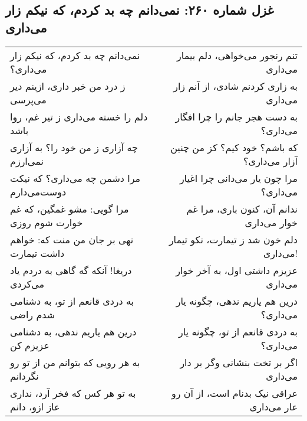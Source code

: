 \begin{center}
\section*{غزل شماره ۲۶۰: نمی‌دانم چه بد کردم، که نیکم زار می‌داری}
\label{sec:260}
\begin{longtable}{l p{0.5cm} r}
نمی‌دانم چه بد کردم، که نیکم زار می‌داری؟
&&
تنم رنجور می‌خواهی، دلم بیمار می‌داری
\\
ز درد من خبر داری، ازینم دیر می‌پرسی
&&
به زاری کردنم شادی، از آنم زار می‌داری
\\
دلم را خسته می‌داری ز تیر غم، روا باشد
&&
به دست هجر جانم را چرا افگار می‌داری؟
\\
چه آزاری ز من خود را؟ به آزاری نمی‌ارزم
&&
که باشم؟ خود کیم؟ کز من چنین آزار می‌داری؟
\\
مرا دشمن چه می‌داری؟ که نیکت دوست‌می‌دارم
&&
مرا چون یار می‌دانی چرا اغیار می‌داری؟
\\
مرا گویی: مشو غمگین، که غم خوارت شوم روزی
&&
ندانم آن، کنون باری، مرا غم خوار می‌داری
\\
نهی بر جان من منت که: خواهم داشت تیمارت
&&
دلم خون شد ز تیمارت، نکو تیمار می‌داری!
\\
دریغا! آنکه گه گاهی به دردم یاد می‌کردی
&&
عزیزم داشتی اول، به آخر خوار می‌داری
\\
به دردی قانعم از تو، به دشنامی شدم راضی
&&
درین هم یاریم ندهی، چگونه یار می‌داری؟
\\
درین هم یاریم ندهی، به دشنامی عزیزم کن
&&
به دردی قانعم از تو، چگونه یار می‌داری؟
\\
به هر رویی که بتوانم من از تو رو نگردانم
&&
اگر بر تخت بنشانی وگر بر دار می‌داری
\\
به تو هر کس که فخر آرد، نداری عاز ازو، دانم
&&
عراقی نیک بدنام است، از آن رو عار می‌داری
\\
\end{longtable}
\end{center}
